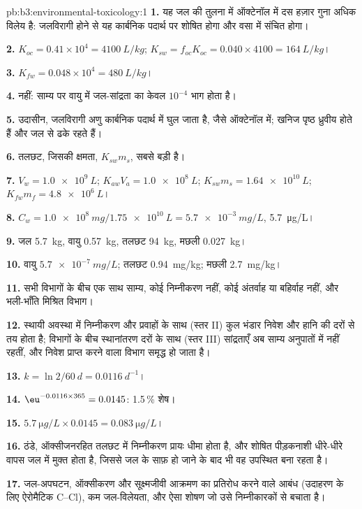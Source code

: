\begin{solution}{pb:b3:environmental-toxicology:1}
\textbf{1.} यह जल की तुलना में ऑक्टेनॉल में दस हज़ार गुना अधिक विलेय है: जलविरागी होने से
यह कार्बनिक पदार्थ पर शोषित होगा और वसा में संचित होगा।

\textbf{2.} $K_{oc} = 0.41 \times 10^4 = \qty{4100}{L/kg}$; $K_{sw} = f_{oc}K_{oc} = 0.040 \times 4100 = \qty{164}{L/kg}$।

\textbf{3.} $K_{fw} = 0.048 \times 10^4 = \qty{480}{L/kg}$।

\textbf{4.} नहीं: साम्य पर वायु में जल-सांद्रता का केवल $10^{-4}$ भाग होता है।

\textbf{5.} उदासीन, जलविरागी अणु कार्बनिक पदार्थ में घुल जाता है, जैसे
ऑक्टेनॉल में; खनिज पृष्ठ ध्रुवीय होते हैं और जल से ढके रहते हैं।

\textbf{6.} तलछट, जिसकी क्षमता, $K_{sw}m_s$, सबसे बड़ी है।

\textbf{7.} $V_w = \qty{1.0e9}{L}$; $K_{aw}V_a = \qty{1.0e8}{L}$; $K_{sw}m_s = \qty{1.64e10}{L}$; $K_{fw}m_f = \qty{4.8e6}{L}$।

\textbf{8.} $C_w = \qty{1.0e8}{mg}/\qty{1.75e10}{L} = \qty{5.7e-3}{mg/L}$, \qty{5.7}{\micro g/L}।

\textbf{9.} जल \qty{5.7}{kg}, वायु \qty{0.57}{kg}, तलछट \qty{94}{kg}, मछली \qty{0.027}{kg}।

\textbf{10.} वायु $\qty{5.7e-7}{mg/L}$; तलछट \qty{0.94}{mg/kg}; मछली \qty{2.7}{mg/kg}।

\textbf{11.} सभी विभागों के बीच एक साथ साम्य, कोई निम्नीकरण नहीं, कोई
अंतर्वाह या बहिर्वाह नहीं, और भली-भाँति मिश्रित विभाग।

\textbf{12.} स्थायी अवस्था में निम्नीकरण और प्रवाहों के साथ (स्तर II) कुल भंडार
निवेश और हानि की दरों से तय होता है; विभागों के बीच स्थानांतरण दरों के साथ (स्तर III)
सांद्रताएँ अब साम्य अनुपातों में नहीं रहतीं, और निवेश प्राप्त करने वाला
विभाग समृद्ध हो जाता है।

\textbf{13.} $k = \ln 2/\qty{60}{d} = \qty{0.0116}{d^{-1}}$।

\textbf{14.} $\eu^{-0.0116 \times 365} = 0.0145$: 1.5\,\% शेष।

\textbf{15.} $\qty{5.7}{\micro g/L} \times 0.0145 = \qty{0.083}{\micro g/L}$।

\textbf{16.} ठंडे, ऑक्सीजनरहित तलछट में निम्नीकरण प्रायः धीमा होता है, और शोषित
पीड़कनाशी धीरे-धीरे वापस जल में मुक्त होता है, जिससे जल के साफ़ हो जाने के बाद भी
वह उपस्थित बना रहता है।

\textbf{17.} जल-अपघटन, ऑक्सीकरण और सूक्ष्मजीवी आक्रमण का प्रतिरोध करने वाले आबंध (उदाहरण के लिए
ऐरोमैटिक C--Cl), कम जल-विलेयता, और ऐसा शोषण जो उसे
निम्नीकारकों से बचाता है।


\end{solution}
